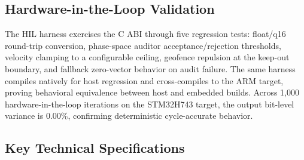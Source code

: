 \documentclass[11pt,oneside]{article}
\begin{document}
\subsection{Hardware-in-the-Loop Validation}

The HIL harness exercises the C ABI through five regression tests: float/q16 round-trip conversion, phase-space auditor acceptance/rejection thresholds, velocity clamping to a configurable ceiling, geofence repulsion at the keep-out boundary, and fallback zero-vector behavior on audit failure. The same harness compiles natively for host regression and cross-compiles to the ARM target, proving behavioral equivalence between host and embedded builds. Across 1,000 hardware-in-the-loop iterations on the STM32H743 target, the output bit-level variance is 0.00\%, confirming deterministic cycle-accurate behavior.

\subsection{Key Technical Specifications}
\end{document}
